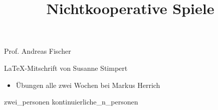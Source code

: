 \documentclass[a4paper, fleqn]{scrartcl}
\title{Nichtkooperative Spiele}
\begin{document}
\maketitle
\begin{center}
  Prof. Andreas Fischer
  
  \LaTeX-Mitschrift von Susanne Stimpert
\end{center}

\begin{itemize}
\item Übungen alle zwei Wochen bei Markus Herrich
\end{itemize}

{zwei_personen}
{kontinuierliche_n_personen}
\end{document}
